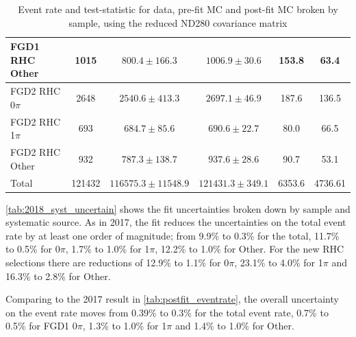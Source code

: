 \begin{table}
\begin{tabular}{ l | c c c | c c }
		FGD1 \numu RHC Other 	& 1015 	& $800.4\pm166.3$	& $1006.9\pm30.6$  & 153.8  & 63.4 	\\ 
		\hline
		FGD2 \numu RHC 0$\pi$ 	& 2648  & $2540.6\pm413.3$	& $2697.1\pm46.9$ & 187.6  & 136.5 	\\ 
		FGD2 \numu RHC 1$\pi$ 	& 693 	& $684.7\pm85.6$	& $690.6\pm22.7$  & 80.0 & 66.5 	\\ 
		FGD2 \numu RHC Other 	& 932 	& $787.3\pm138.7$	& $937.6\pm28.6$  & 90.7  & 53.1 	\\ 
		\hline
		Total 				& 121432 & $116575.3\pm11548.9$	& $121431.3\pm349.1$ & 6353.6 & 4736.61 \\
		\hline
		\hline
	\end{tabular}
	\caption{Event rate and test-statistic for data, pre-fit MC and post-fit MC broken by sample, using the reduced ND280 covariance matrix}
	\label{tab:postfit_eventrate_2018}
\end{table}

\autoref{tab:2018_syst_uncertain} shows the fit uncertainties broken down by sample and systematic source. As in 2017, the fit reduces the uncertainties on the total event rate by at least one order of magnitude; from 9.9\% to 0.3\% for the total, 11.7\% to 0.5\% for 0$\pi$, 1.7\% to 1.0\% for 1$\pi$, 12.2\% to 1.0\% for Other. For the new RHC selections there are reductions of 12.9\% to 1.1\% for 0$\pi$, 23.1\% to 4.0\% for 1$\pi$ and 16.3\% to 2.8\% for Other.

Comparing to the 2017 result in \autoref{tab:postfit_eventrate}, the overall uncertainty on the event rate moves from 0.39\% to 0.3\% for the total event rate, 0.7\% to 0.5\% for FGD1 0$\pi$, 1.3\% to 1.0\% for 1$\pi$ and 1.4\% to 1.0\% for Other.

